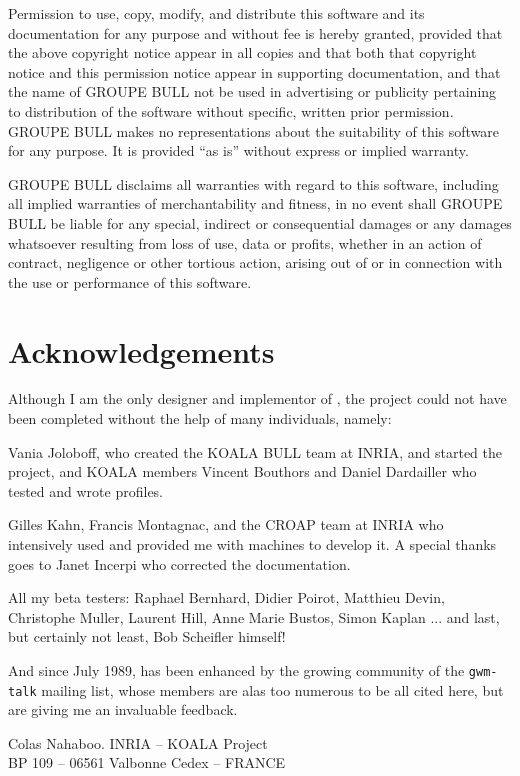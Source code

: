 {\sf
Permission to use, copy, modify, and distribute this software and its
documentation for any purpose and without fee is hereby granted, provided
that the above copyright notice appear in all copies and that both that
copyright notice and this permission notice appear in supporting
documentation, and that the name of GROUPE BULL not be used in advertising
or publicity pertaining to distribution of the software without specific,
written prior permission.  GROUPE BULL makes no representations about the
suitability of this software for any purpose.  It is provided ``as is''
without express or implied warranty.

GROUPE BULL disclaims all warranties with regard to this software,
including all implied warranties of merchantability and fitness,
in no event shall GROUPE BULL be liable for any special,
indirect or consequential damages or any damages
whatsoever resulting from loss of use, data or profits,
whether in an action of contract, negligence or other tortious
action, arising out of or in connection with the use 
or performance of this software.
}

\section*{Acknowledgements}

Although I am the only designer and implementor of {\GWM}, the project could
not have been completed without the help of many individuals, namely:

Vania Joloboff, who created the KOALA BULL team at INRIA, and started the 
{\GWM} project, and KOALA members Vincent Bouthors and Daniel Dardailler
who tested {\GWM} and wrote {\WOOL} profiles.

Gilles Kahn, Francis Montagnac, and the CROAP team at INRIA who intensively
used {\GWM} and provided me with machines to develop it. A special thanks
goes to Janet Incerpi who corrected the documentation.

All my beta testers: Raphael Bernhard, Didier Poirot, Matthieu Devin,
Christophe Muller, Laurent Hill, Anne Marie Bustos, Simon Kaplan ...
and last, but certainly not least, Bob Scheifler himself!

And since July 1989, {\GWM} has been enhanced by the growing community of
the {\tt gwm-talk} mailing list, whose members are alas too numerous to be all 
cited here, but are giving me an invaluable feedback.

\begin{flushright}
{\Large Colas Nahaboo.\quad}
{\small
INRIA -- KOALA Project\\
BP 109 -- 06561 Valbonne Cedex -- FRANCE\\
}
\end{flushright}

